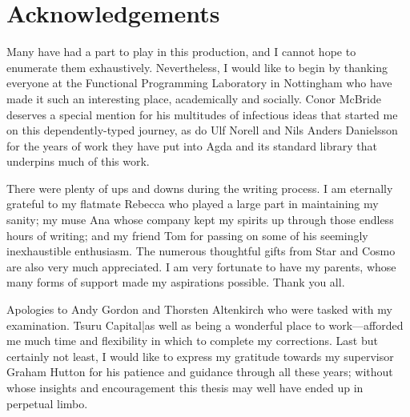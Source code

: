 \documentclass[12pt,twoside,openright]{book}
\begin{document}

\chapter*{Acknowledgements}

Many have had a part to play in this production, and I cannot hope to
enumerate them exhaustively. Nevertheless, I would like to begin by thanking
everyone at the Functional Programming Laboratory in Nottingham who have
made it such an interesting place, academically and socially. Conor McBride
deserves a special mention for his multitudes of infectious ideas that
started me on this dependently-typed journey, as do Ulf Norell and Nils
Anders Danielsson for the years of work they have put into Agda and its
standard library that underpins much of this work.

There were plenty of ups and downs during the writing process. I am
eternally grateful to my flatmate Rebecca who played a large part in
maintaining my sanity; my muse Ana whose company kept my spirits up through
those endless hours of writing; and my friend Tom for passing on some of his
seemingly inexhaustible enthusiasm. The numerous thoughtful gifts from Star
and Cosmo are also very much appreciated. I am very fortunate to have my
parents, whose many forms of support made my aspirations possible. Thank you
all.

Apologies to Andy Gordon and Thorsten Altenkirch who were tasked with my
examination. Tsuru Capital|as well as being a wonderful place to
work---afforded me much time and flexibility in which to complete my
corrections. Last but certainly not least, I would like to express my
gratitude towards my supervisor Graham Hutton for his patience and guidance
through all these years; without whose insights and encouragement this
thesis may well have ended up in perpetual limbo.

\tableofcontents

{}
{}
{}
{}
{}
{}
{}
{}
{}
{}



\end{document}
